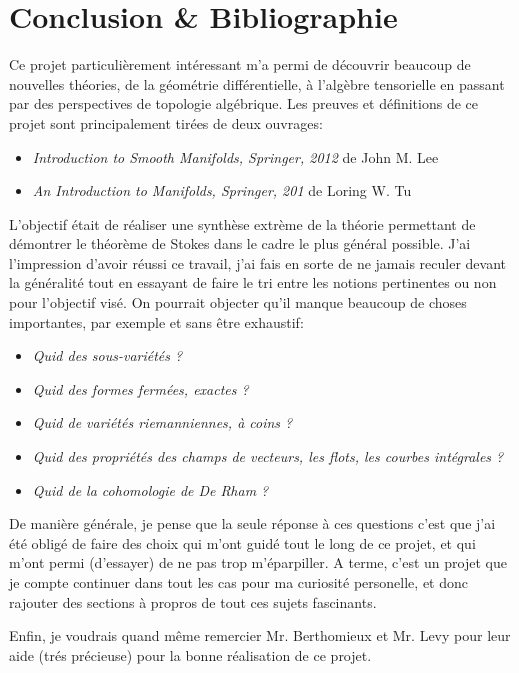 \chapter{Conclusion \& Bibliographie}
Ce projet particulièrement intéressant m'a permi de découvrir beaucoup de nouvelles théories, de la géométrie différentielle, à l'algèbre tensorielle en passant par des perspectives de topologie algébrique. Les preuves et définitions de ce projet sont principalement tirées de deux ouvrages:
\begin{itemize}
   \item \textit{Introduction to Smooth Manifolds, Springer, 2012} de John M. Lee
   \item \textit{An Introduction to Manifolds, Springer, 201} de Loring W. Tu
\end{itemize}

L'objectif était de réaliser une synthèse extrème de la théorie permettant de démontrer le théorème de Stokes dans le cadre le plus général possible. J'ai l'impression d'avoir réussi ce travail, j'ai fais en sorte de ne jamais reculer devant la généralité tout en essayant de faire le tri entre les notions pertinentes ou non pour l'objectif visé. On pourrait objecter qu'il manque beaucoup de choses importantes, par exemple et sans être exhaustif:
\begin{itemize}
   \item \textit{Quid des sous-variétés ?}
   \item \textit{Quid des formes fermées, exactes ?}
   \item \textit{Quid de variétés riemanniennes, à coins ?}
   \item \textit{Quid des propriétés des champs de vecteurs, les flots, les courbes intégrales ?}
   \item \textit{Quid de la cohomologie de De Rham ?}
\end{itemize}
De manière générale, je pense que la seule réponse à ces questions c'est que j'ai été obligé de faire des choix qui m'ont guidé tout le long de ce projet, et qui m'ont permi (d'essayer) de ne pas trop m'éparpiller. A terme, c'est un projet que je compte continuer dans tout les cas pour ma curiosité personelle, et donc rajouter des sections à propros de tout ces sujets fascinants.\<

Enfin, je voudrais quand même remercier Mr. Berthomieux et Mr. Levy pour leur aide (trés précieuse) pour la bonne réalisation de ce projet.
